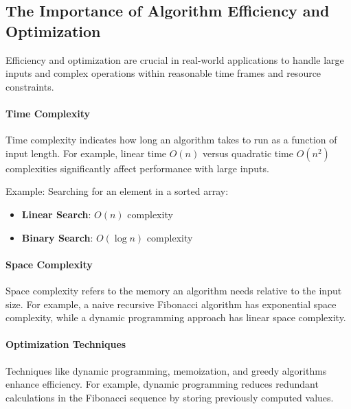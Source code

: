 \documentclass[12pt]{book} %
\begin{document}
\subsection{The Importance of Algorithm Efficiency and Optimization}
Efficiency and optimization are crucial in real-world applications to handle large inputs and complex operations within reasonable time frames and resource constraints.

\paragraph{Time Complexity}
Time complexity indicates how long an algorithm takes to run as a function of input length. For example, linear time $O(n)$ versus quadratic time $O(n^2)$ complexities significantly affect performance with large inputs.

Example: Searching for an element in a sorted array:
\begin{itemize}
    \item \textbf{Linear Search}: $O(n)$ complexity
    \item \textbf{Binary Search}: $O(\log n)$ complexity
\end{itemize}

\paragraph{Space Complexity}
Space complexity refers to the memory an algorithm needs relative to the input size. For example, a naive recursive Fibonacci algorithm has exponential space complexity, while a dynamic programming approach has linear space complexity.

\paragraph{Optimization Techniques}
Techniques like dynamic programming, memoization, and greedy algorithms enhance efficiency. For example, dynamic programming reduces redundant calculations in the Fibonacci sequence by storing previously computed values.
\end{document}
